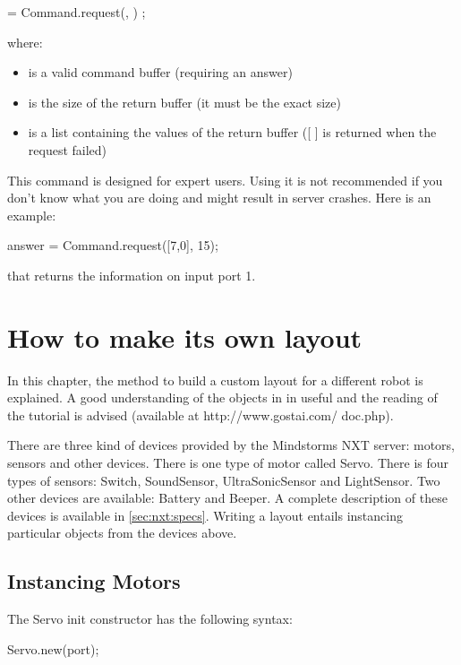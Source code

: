 \begin{urbiunchecked}
   = Command.request(, ) ;
\end{urbiunchecked}

where:
\begin{itemize}
\item {} is a valid command buffer (requiring an answer)
\item {} is the size of the return buffer (it must be the exact
  size)
\item {} is a list containing the values of the return buffer ([ ]
  is returned when the request failed)
\end{itemize}

This command is designed for expert users. Using it is not recommended if you
don't know what you are doing and might result in server crashes.
Here is an example:
\begin{urbiunchecked}
  answer = Command.request([7,0], 15);
\end{urbiunchecked}

that returns the information on input port 1.

\section{How to make its own layout}

In this chapter, the method to build a custom layout for a different robot is
explained. A good understanding of the objects in \urbi in useful and the
reading of the \urbi tutorial is advised (available at http://www.gostai.com/
doc.php).

There are three kind of devices provided by the Mindstorms NXT server:
motors, sensors and other devices. There is one type of motor called
Servo. There is four types of sensors: Switch, SoundSensor, UltraSonicSensor
and LightSensor. Two other devices are available: Battery and Beeper. A
complete description of these devices is available in
\autoref{sec:nxt:specs}.  Writing a layout entails instancing particular
objects from the devices above.

\subsection{Instancing Motors}
The Servo init constructor has the following syntax:
\begin{urbiunchecked}
Servo.new(port);
\end{urbiunchecked}

